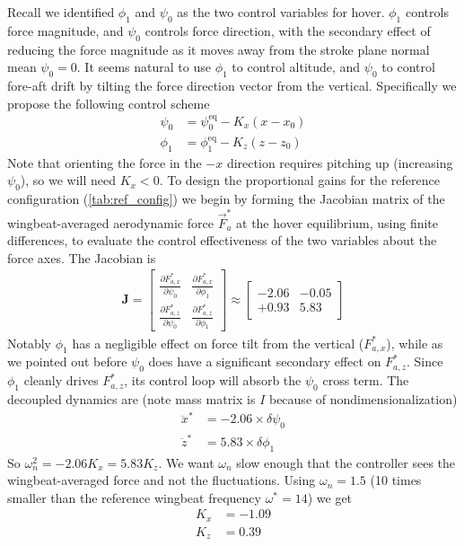 \documentclass[11pt,letterpaper]{article}
\begin{document}
Recall we identified $\phi_1$ and $\psi_0$ as the two control
variables for hover. $\phi_1$ controls force magnitude, and
$\psi_0$ controls force direction, with the secondary effect
of reducing the force magnitude as it moves away from the stroke
plane normal mean $\psi_0 = 0$. It seems natural to use $\phi_1$
to control altitude, and $\psi_0$ to control fore-aft drift
by tilting the force direction vector from the vertical.
Specifically we propose the following control scheme
\begin{align*}
    \psi_0 &= \psi_0^\text{eq} - K_x (x - x_0) \\
    \phi_1 &= \phi_1^\text{eq} - K_z (z - z_0)
\end{align*}
Note that orienting the force in the $-x$ direction requires
pitching up (increasing $\psi_0$), so we will need $K_x < 0$.
To design the proportional gains for the reference configuration
(\autoref{tab:ref_config}) we begin by forming the Jacobian matrix
of the wingbeat-averaged aerodynamic force $\vec{F}_a^*$
at the hover equilibrium, using finite differences,
to evaluate the control effectiveness of the two variables
about the force axes. The Jacobian is
\begin{align*}
    \mathbf{J} = \begin{bmatrix}
        \displaystyle \frac{\partial F^*_{a,x}}{\partial \psi_0} &\displaystyle  \frac{\partial F^*_{a,x}}{\partial \phi_1} \\
        \displaystyle  \frac{\partial F^*_{a,z}}{\partial \psi_0} &  \displaystyle \frac{\partial F^*_{a,z}}{\partial \phi_1}
        \end{bmatrix}
        \approx \begin{bmatrix}
            -2.06 & -0.05 \\
            +0.93 & 5.83
    \end{bmatrix}
\end{align*}
Notably $\phi_1$ has a negligible effect on force tilt
from the vertical ($F^*_{a,x}$), while as we pointed out before $\psi_0$
does have a significant secondary effect on $F^*_{a,z}$.
Since $\phi_1$ cleanly drives $F^*_{a,z}$, its control
loop will absorb the $\psi_0$ cross term.
The decoupled dynamics are (note mass matrix is $I$ because of
nondimensionalization)
\begin{align*}
    \ddot{x}^* &= -2.06 \times \delta \psi_0 \\
    \ddot{z}^* &= 5.83 \times \delta \phi_1
\end{align*}
So $\omega_n^2 = -2.06 K_x = 5.83 K_z$. We want $\omega_n$
slow enough that the controller sees the wingbeat-averaged
force and not the fluctuations. Using $\omega_n = 1.5$ (10
times smaller than the reference wingbeat frequency $\omega^* = 14$)
we get
\begin{align*}
    K_x &= -1.09 \\
    K_z &= 0.39
\end{align*}
\end{document}
